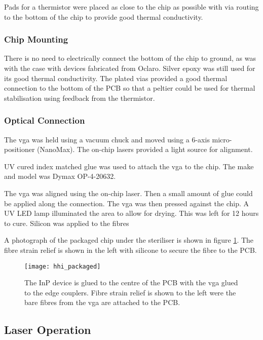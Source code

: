 Pads for a thermistor were placed as close to the chip as possible with via routing to the bottom of the chip to provide good thermal conductivity.

\subsubsection*{Chip Mounting}

There is no need to electrically connect the bottom of the chip to ground, as was with the case with devices fabricated from Oclaro. Silver epoxy was still used for its good thermal conductivity. The plated vias provided a good thermal connection to the bottom of the PCB so that a peltier could be used for thermal stabilisation using feedback from the thermistor.

\subsubsection*{Optical Connection}

The \ac{vga} was held using a vacuum chuck and moved using a 6-axis micro-positioner (NanoMax). The on-chip lasers provided a light source for alignment. 

UV cured index matched glue was used to attach the \ac{vga} to the chip. The make and model was Dymax OP-4-20632.

The \ac{vga} was aligned using the on-chip laser. Then a small amount of glue could be applied along the connection. The \ac{vga} was then pressed against the chip. A UV LED lamp illuminated the area to allow for drying. This was left for 12 hours to cure. Silicon was applied to the fibres 

A photograph of the packaged chip under the steriliser is shown in figure \ref{fig:hhi_photo}. The fibre strain relief is shown in the left with silicone to secure the fibre to the PCB. 

\begin{figure}
	\centering
	\texttt{[image: hhi\_packaged]}
	\caption[Photograph of packaged HHI transmitter]{The \ac{InP} device is glued to the centre of the PCB with the \ac{vga} glued to the edge couplers. Fibre strain relief is shown to the left were the bare fibres from the \ac{vga} are attached to the PCB.}
	\label{fig:hhi_photo}
\end{figure}

\subsection{Laser Operation}

